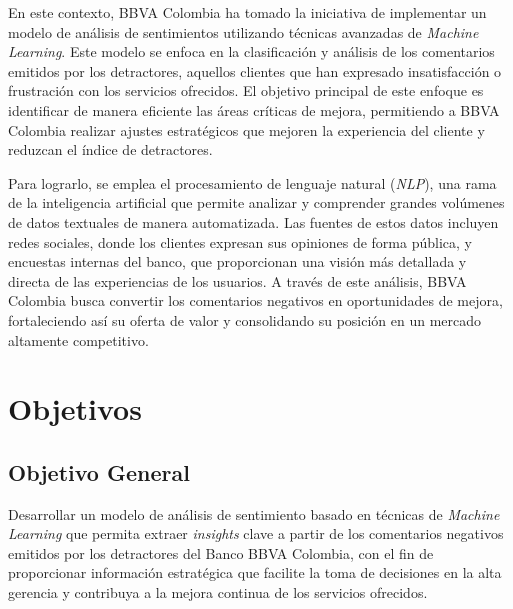 \documentclass{matematicasud}
\begin{document}
En este contexto, BBVA Colombia ha tomado la iniciativa de implementar un modelo de análisis de sentimientos utilizando técnicas avanzadas de \textit{Machine Learning}. Este modelo se enfoca en la clasificación y análisis de los comentarios emitidos por los detractores, aquellos clientes que han expresado insatisfacción o frustración con los servicios ofrecidos. El objetivo principal de este enfoque es identificar de manera eficiente las áreas críticas de mejora, permitiendo a BBVA Colombia realizar ajustes estratégicos que mejoren la experiencia del cliente y reduzcan el índice de detractores.

Para lograrlo, se emplea el procesamiento de lenguaje natural (\textit{NLP}), una rama de la inteligencia artificial que permite analizar y comprender grandes volúmenes de datos textuales de manera automatizada. Las fuentes de estos datos incluyen redes sociales, donde los clientes expresan sus opiniones de forma pública, y encuestas internas del banco, que proporcionan una visión más detallada y directa de las experiencias de los usuarios. A través de este análisis, BBVA Colombia busca convertir los comentarios negativos en oportunidades de mejora, fortaleciendo así su oferta de valor y consolidando su posición en un mercado altamente competitivo.

\section{Objetivos} 
\subsection{Objetivo General} 
Desarrollar un modelo de análisis de sentimiento basado en técnicas de \textit{Machine Learning} que permita extraer \textit{insights} clave a partir de los comentarios negativos emitidos por los detractores del Banco BBVA Colombia, con el fin de proporcionar información estratégica que facilite la toma de decisiones en la alta gerencia y contribuya a la mejora continua de los servicios ofrecidos.
\end{document}

